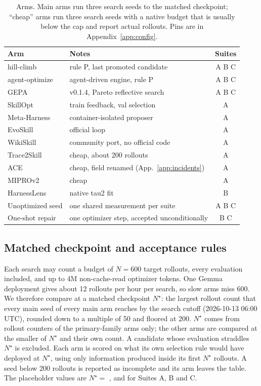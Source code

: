 \begin{table}[t]
\caption{Arms. Main arms run three search seeds to the matched checkpoint; ``cheap'' arms run three search seeds with a native budget that is usually below the cap and report actual rollouts. Pins are in Appendix~\ref{app:config}.}
\label{tab:arms}
\centering\small
\begin{tabularx}{\columnwidth}{@{}lXc@{}}
\toprule
Arm & Notes & Suites \\
\midrule
\capevolve{} hill-climb & rule P, last promoted candidate & A B C \\
\capevolve{} agent-optimize & agent-driven engine, rule P & A B C \\
GEPA \citep{gepa} & v0.1.4, Pareto reflective search & A B C \\
SkillOpt \citep{skillopt} & train feedback, val selection & A \\
Meta-Harness \citep{meta-harness} & container-isolated proposer & A \\
EvoSkill \citep{evoskill} & official loop & A \\
WikiSkill \citep{wikiskill} & community port, no official code & A \\
Trace2Skill \citep{trace2skill} & cheap, about 200 rollouts & A \\
ACE \citep{ace} & cheap, field renamed (App.~\ref{app:incidents}) & A \\
MIPROv2 \citep{miprov2-dspy} & cheap & A \\
HarnessLens \citep{xu2026harnesslens} & native tau2 fit & B \\
Unoptimized seed & one shared measurement per suite & A B C \\
One-shot repair & one optimizer step, accepted unconditionally & B C \\
\bottomrule
\end{tabularx}
\end{table}

\subsection{Matched checkpoint and acceptance rules}

Each search may count a budget of $N=600$ target rollouts, every evaluation included, and up to 4M non-cache-read optimizer tokens. One Gemma deployment gives about 12 rollouts per hour per search, so slow arms miss 600. We therefore compare at a matched checkpoint $N^\star$: the largest rollout count that every main seed of every main arm reaches by the search cutoff (2026-10-13 06:00 UTC), rounded down to a multiple of 50 and floored at 200. $N^\star$ comes from rollout counters of the primary-family arms only; the other arms are compared at the smaller of $N^\star$ and their own count. A candidate whose evaluation straddles $N^\star$ is excluded. Each arm is scored on what its own selection rule would have deployed at $N^\star$, using only information produced inside its first $N^\star$ rollouts. A seed below 200 rollouts is reported as incomplete and its arm leaves the table. The placeholder values are $N^\star=$ \mockBstarA{}, \mockBstarB{} and \mockBstarC{} for Suites A, B and C. 

